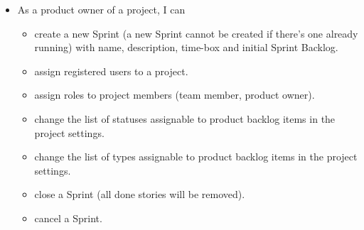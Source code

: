 \documentclass[
	accentcolor=tud1a %
]{tudreport}
\begin{document}
\begin{itemize}
	\item As a product owner of a project, I can
	\begin{itemize}
		\item create a new Sprint (a new Sprint cannot be created if there's one already running) with name, description, time-box and initial Sprint Backlog.
		\item assign registered users to a project.
		\item assign roles to project members (team member, product owner).
		\item change the list of statuses assignable to product backlog items in the project settings.
		\item change the list of types assignable to product backlog items in the project settings.
		\item close a Sprint (all done stories will be removed).
		\item cancel a Sprint.
	\end{itemize}
\end{itemize}




\end{document}
